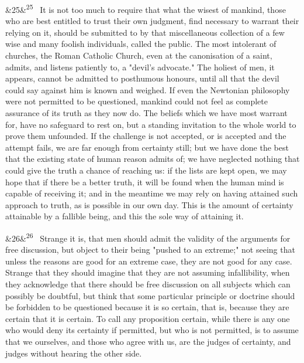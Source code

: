 \documentclass[12pt]{article}
\newcommand{\para}[1][]{\par\noindent\ifx&#1&\else\textsuperscript{\footnotesize #1}~\fi}
\begin{document}
\para[25] It is not too much to require that what the wisest of mankind, those who are best entitled to trust their own judgment, find necessary to warrant their relying on it, should be submitted to by that miscellaneous collection of a few wise and many foolish individuals, called the public. The most intolerant of churches, the Roman Catholic Church, even at the canonisation of a saint, admits, and listens patiently to, a "devil's advocate." The holiest of men, it appears, cannot be admitted to posthumous honours, until all that the devil could say against him is known and weighed. If even the Newtonian philosophy were not permitted to be questioned, mankind could not feel as complete assurance of its truth as they now do. The beliefs which we have most warrant for, have no safeguard to rest on, but a standing invitation to the whole world to prove them unfounded. If the challenge is not accepted, or is accepted and the attempt fails, we are far enough from certainty still; but we have done the best that the existing state of human reason admits of; we have neglected nothing that could give the truth a chance of reaching us: if the lists are kept open, we may hope that if there be a better truth, it will be found when the human mind is capable of receiving it; and in the meantime we may rely on having attained such approach to truth, as is possible in our own day. This is the amount of certainty attainable by a fallible being, and this the sole way of attaining it.

\para[26] Strange it is, that men should admit the validity of the arguments for free discussion, but object to their being "pushed to an extreme;" not seeing that unless the reasons are good for an extreme case, they are not good for any case. Strange that they should imagine that they are not assuming infallibility, when they acknowledge that there should be free discussion on all subjects which can possibly be doubtful, but think that some particular principle or doctrine should be forbidden to be questioned because it is so certain, that is, because they are certain that it is certain. To call any proposition certain, while there is any one who would deny its certainty if permitted, but who is not permitted, is to assume that we ourselves, and those who agree with us, are the judges of certainty, and judges without hearing the other side.
\end{document}
